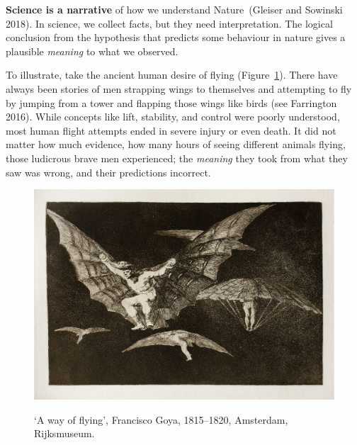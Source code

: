 \documentclass[
  letterpaper,
  12pt,
  british]{tufte-book}
\theoremstyle{plain}
\theoremstyle{plain}
\theoremstyle{definition}
\theoremstyle{remark}
\begin{document}
\textbf{Science is a narrative} of how we understand Nature~(Gleiser and
Sowinski
2018).
In science, we collect facts, but they need interpretation. The logical
conclusion from the hypothesis that predicts some behaviour in nature
gives a plausible \emph{meaning} to what we observed.

To illustrate, take the ancient human desire of flying
(Figure~\ref{fig-goya}). There have always been stories of men strapping
wings to themselves and attempting to fly by jumping from a tower and
flapping those wings like birds (see Farrington
2016).
While concepts like lift, stability, and control were poorly understood,
most human flight attempts ended in severe injury or even death. It did
not matter how much evidence, how many hours of seeing different animals
flying, those ludicrous brave men experienced; the \emph{meaning} they
took from what they saw was wrong, and their predictions incorrect.

\hypertarget{fig-goya}{}
\begin{figure}

\includegraphics{Images/goya.jpg}

\label{fig-goya}`A way of flying', Francisco Goya, 1815--1820,
Amsterdam, Rijksmuseum.

\end{figure}
\end{document}
